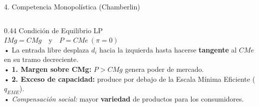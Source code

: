 \documentclass[aspectratio=169, 10pt]{beamer}
\begin{document}
\begin{frame}{4. Competencia Monopolística (Chamberlin)}
\begin{columns}[T]
    \begin{column}{0.44\textwidth}
      {\scriptsize\color{grisTexto}Condición de Equilibrio LP}\\[1pt]
      {\normalsize\color{azulPrincipal}\textbf{\(IMg = CMg \quad \text{y} \quad P = CMe \ (\pi = 0)\)}}\\[4pt]
      {\scriptsize
        • La entrada libre desplaza \(d_i\) hacia la izquierda hasta hacerse \textbf{tangente} al \(CMe\) en su tramo decreciente.\\[4pt]
      }
      {\scriptsize
        • \textbf{1. Margen sobre CMg:} \(P > CMg\) genera poder de mercado.\\
        • \textbf{2. Exceso de capacidad:} produce por debajo de la Escala Mínima Eficiente (\(q_{EME}\)).\\
        • \textit{Compensación social:} mayor \textbf{variedad} de productos para los consumidores.
      }
    \end{column}
  \end{columns}

\end{frame}
\end{document}
